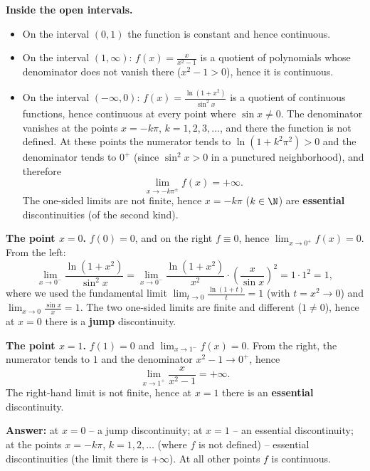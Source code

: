 \begin{solution}
\textbf{Inside the open intervals.}
\begin{itemize}
  \item On the interval $(0,1)$ the function is constant and hence continuous.
  \item On the interval $(1,\infty)$: $f(x)=\frac{x}{x^2-1}$ is a quotient of polynomials whose denominator does not vanish there ($x^2-1>0$), hence it is continuous.
  \item On the interval $(-\infty,0)$: $f(x)=\frac{\ln(1+x^2)}{\sin^2x}$ is a quotient of continuous functions, hence continuous at every point where $\sin x\neq0$. The denominator vanishes at the points $x=-k\pi$, $k=1,2,3,\dots$, and there the function is not defined. At these points the numerator tends to $\ln(1+k^2\pi^2)>0$ and the denominator tends to $0^+$ (since $\sin^2x>0$ in a punctured neighborhood), and therefore
  \[ \lim_{x\to-k\pi^\pm}f(x)=+\infty. \]
  The one-sided limits are not finite, hence $x=-k\pi$ ($k\in\N$) are \textbf{essential} discontinuities (of the second kind).
\end{itemize}

\textbf{The point $x=0$.} $f(0)=0$, and on the right $f\equiv0$, hence $\lim_{x\to0^+}f(x)=0$. From the left:
\[ \lim_{x\to0^-}\frac{\ln(1+x^2)}{\sin^2x}=\lim_{x\to0^-}\frac{\ln(1+x^2)}{x^2}\cdot\left(\frac{x}{\sin x}\right)^2=1\cdot1^2=1, \]
where we used the fundamental limit $\lim_{t\to0}\frac{\ln(1+t)}{t}=1$ (with $t=x^2\to0$) and $\lim_{x\to0}\frac{\sin x}{x}=1$. The two one-sided limits are finite and different ($1\neq0$), hence at $x=0$ there is a \textbf{jump} discontinuity.

\textbf{The point $x=1$.} $f(1)=0$ and $\lim_{x\to1^-}f(x)=0$. From the right, the numerator tends to $1$ and the denominator $x^2-1\to0^+$, hence
\[ \lim_{x\to1^+}\frac{x}{x^2-1}=+\infty. \]
The right-hand limit is not finite, hence at $x=1$ there is an \textbf{essential} discontinuity.

\textbf{Answer:} at $x=0$ -- a jump discontinuity; at $x=1$ -- an essential discontinuity; at the points $x=-k\pi$, $k=1,2,\dots$ (where $f$ is not defined) -- essential discontinuities (the limit there is $+\infty$). At all other points $f$ is continuous.
\end{solution}
